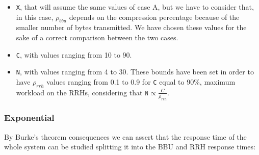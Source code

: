 \documentclass[11pt,a4paper,oneside, openright]{article}
\begin{document}
\begin{itemize}
	\item \texttt{X}, that will assume the same values of case A, but we have to consider that, in this case, $ \rho_{bbu} $ depends on the compression percentage because of the smaller number of bytes transmitted. We have chosen these values for the sake of a correct comparison between the two cases.
	\item \texttt{C}, with values ranging from 10 to 90. 
	\item \texttt{N}, with values ranging from 4 to 30. These bounds have been set in order to have $\rho_{rrh}$ values ranging from 0.1 to 0.9 for \texttt{C} equal to 90\%, maximum workload on the RRHs, considering that $\texttt{N} \propto \frac{C}{\rho_{rrh}}$.	
\end{itemize}


\subsubsection{Exponential}
By Burke's theorem consequences we can assert that the response time of the whole system can be studied splitting it into the BBU and RRH response times:
\end{document}
